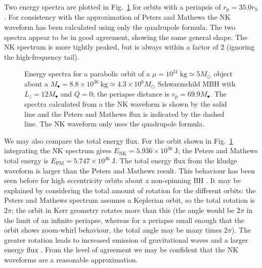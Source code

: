 \documentclass[useAMS,usedcolumn,usegraphicx,usenatbib]{mn2e}
\newcommand{\figref}[1]{Fig.~\ref{fig:#1}}
\newcommand{\units}[1]{\ensuremath{~\mathrm{#1}}}
\newcommand{\sub}[1]{\ensuremath{_\mathrm{#1}}}
\begin{document}
Two energy spectra are plotted in \figref{Energy} for orbits with a periapsis of $r\sub{p} = 35.0 r\sub{S}$. For consistency with the approximation of Peters and Mathews the NK waveform has been calculated using only the quadrupole formula.
The two spectra appear to be in good agreement, showing the same general shape. The NK spectrum is more tightly peaked, but is always within a factor of $2$ (ignoring the high-frequency tail).
\begin{figure}
  \begin{center}
    \caption{Energy spectra for a parabolic orbit of a $\mu = 10^{31}\units{kg} \simeq 5 M_\odot$ object about a $M_\bullet = 8.8 \times 10^{36}\units{kg} \simeq 4.3 \times 10^6 M_\odot$ Schwarzschild MBH with $L_z = 12 M_\bullet$ and $Q = 0$; the periapse distance is $r\sub{p} = 69.9 M_\bullet$. The spectra calculated from a the NK waveform is shown by the solid line and the Peters and Mathews flux is indicated by the dashed line. The NK waveform only uses the quadrupole formula.}
    \label{fig:Energy}
  \end{center}
\end{figure}

We may also compare the total energy flux. For the orbit shown in \figref{Energy} integrating the NK spectrum gives $E\sub{NK} = 5.936 \times 10^{36}\units{J}$; the Peters and Mathews total energy is $E\sub{PM} = 5.747 \times 10^{36}\units{J}$. The total energy flux from the kludge waveform is larger than the Peters and Mathews result. This behaviour has been seen before for high eccentricity orbits about a non-spinning BH \citep{Gair2005}. It may be explained by considering the total amount of rotation for the different orbits: the Peters and Mathews spectrum assumes a Keplerian orbit, so the total rotation is $2\pi$; the orbit in Kerr geometry rotates more than this (the angle would be $2\pi$ in the limit of an infinite periapse, whereas for a periapse small enough that the orbit shows zoom-whirl behaviour, the total angle may be many times $2\pi$). The greater rotation leads to increased emission of gravitational waves and a larger energy flux \citep{Berry2010}. From the level of agreement we may be confident that the NK waveforms are a reasonable approximation.
\end{document}
